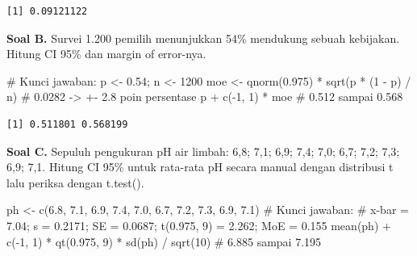 \documentclass[
  indonesian,
  letterpaper,
]{book}
\newenvironment{Shaded}{\begin{snugshade}}{\end{snugshade}}
\newcommand{\CommentTok}[1]{\textcolor[rgb]{0.37,0.37,0.37}{#1}}
\newcommand{\DecValTok}[1]{\textcolor[rgb]{0.68,0.00,0.00}{#1}}
\newcommand{\FloatTok}[1]{\textcolor[rgb]{0.68,0.00,0.00}{#1}}
\newcommand{\FunctionTok}[1]{\textcolor[rgb]{0.28,0.35,0.67}{#1}}
\newcommand{\NormalTok}[1]{\textcolor[rgb]{0.00,0.23,0.31}{#1}}
\newcommand{\OtherTok}[1]{\textcolor[rgb]{0.00,0.23,0.31}{#1}}
\newcommand{\SpecialCharTok}[1]{\textcolor[rgb]{0.37,0.37,0.37}{#1}}
\begin{document}
\begin{verbatim}
[1] 0.09121122
\end{verbatim}

\textbf{Soal B.} Survei 1.200 pemilih menunjukkan 54\% mendukung sebuah
kebijakan. Hitung CI 95\% dan margin of error-nya.

\begin{Shaded}
\begin{Highlighting}[]
\CommentTok{\# Kunci jawaban:}
\NormalTok{p }\OtherTok{\textless{}{-}} \FloatTok{0.54}\NormalTok{; n }\OtherTok{\textless{}{-}} \DecValTok{1200}
\NormalTok{moe }\OtherTok{\textless{}{-}} \FunctionTok{qnorm}\NormalTok{(}\FloatTok{0.975}\NormalTok{) }\SpecialCharTok{*} \FunctionTok{sqrt}\NormalTok{(p }\SpecialCharTok{*}\NormalTok{ (}\DecValTok{1} \SpecialCharTok{{-}}\NormalTok{ p) }\SpecialCharTok{/}\NormalTok{ n) }\CommentTok{\# 0.0282 {-}\textgreater{} +{-} 2.8 poin persentase}
\NormalTok{p }\SpecialCharTok{+} \FunctionTok{c}\NormalTok{(}\SpecialCharTok{{-}}\DecValTok{1}\NormalTok{, }\DecValTok{1}\NormalTok{) }\SpecialCharTok{*}\NormalTok{ moe }\CommentTok{\# 0.512 sampai 0.568}
\end{Highlighting}
\end{Shaded}

\begin{verbatim}
[1] 0.511801 0.568199
\end{verbatim}

\textbf{Soal C.} Sepuluh pengukuran pH air limbah: 6,8; 7,1; 6,9; 7,4;
7,0; 6,7; 7,2; 7,3; 6,9; 7,1. Hitung CI 95\% untuk rata-rata pH secara
manual dengan distribusi t lalu periksa dengan t.test().

\begin{Shaded}
\begin{Highlighting}[]
\NormalTok{ph }\OtherTok{\textless{}{-}} \FunctionTok{c}\NormalTok{(}\FloatTok{6.8}\NormalTok{, }\FloatTok{7.1}\NormalTok{, }\FloatTok{6.9}\NormalTok{, }\FloatTok{7.4}\NormalTok{, }\FloatTok{7.0}\NormalTok{, }\FloatTok{6.7}\NormalTok{, }\FloatTok{7.2}\NormalTok{, }\FloatTok{7.3}\NormalTok{, }\FloatTok{6.9}\NormalTok{, }\FloatTok{7.1}\NormalTok{)}
\CommentTok{\# Kunci jawaban:}
\CommentTok{\# x{-}bar = 7.04; s = 0.2171; SE = 0.0687; t(0.975, 9) = 2.262; MoE = 0.155}
\FunctionTok{mean}\NormalTok{(ph) }\SpecialCharTok{+} \FunctionTok{c}\NormalTok{(}\SpecialCharTok{{-}}\DecValTok{1}\NormalTok{, }\DecValTok{1}\NormalTok{) }\SpecialCharTok{*} \FunctionTok{qt}\NormalTok{(}\FloatTok{0.975}\NormalTok{, }\DecValTok{9}\NormalTok{) }\SpecialCharTok{*} \FunctionTok{sd}\NormalTok{(ph) }\SpecialCharTok{/} \FunctionTok{sqrt}\NormalTok{(}\DecValTok{10}\NormalTok{) }\CommentTok{\# 6.885 sampai 7.195}
\end{Highlighting}
\end{Shaded}
\end{document}
